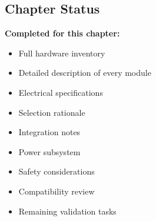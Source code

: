 \subsection{Chapter Status}
\label{sec:ch4-status}

\begin{validationbox}
\textbf{Completed for this chapter:}
\begin{itemize}
    \item Full hardware inventory
    \item Detailed description of every module
    \item Electrical specifications
    \item Selection rationale
    \item Integration notes
    \item Power subsystem
    \item Safety considerations
    \item Compatibility review
    \item Remaining validation tasks
\end{itemize}
\end{validationbox}
